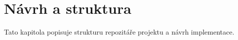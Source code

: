 \chapter{Návrh a struktura}

Tato kapitola popisuje strukturu repozitáře projektu a návrh implementace.









